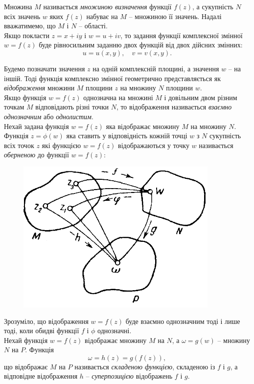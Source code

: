 Множина $M$ називається \textit{множиною визначення} функції $f(z)$, а сукупність $N$ всіх значень $w$ яких $f(z)$ набуває на $M$ -- множиною її значень. Надалі вважатимемо, що $M$ і $N$ -- області. \\

Якщо покласти $z = x + i y$ і $w = u + i v$, то задання функції комплексної змінної $w = f(z)$ буде рівносильним заданню двох функцій від двох дійсних змінних:
\begin{equation}
	\label{eq:2.1.2}
	u = u(x, y), \quad v = v(x, y).
\end{equation}

Будемо позначати значення $z$ на одній комплексній площині, а значення $w$ -- на іншій. Тоді функція комплексно змінної геометрично представляється як \textit{відображення} множини $M$ площини $z$ на множину $N$ площини $w$. \\

Якщо функція $w = f(z)$ однозначна на множині $M$ і довільним двом різним точкам $M$ відповідають різні точки $N$, то відображення називається \textit{взаємно однозначним} або \textit{однолистим}. \\

Нехай задана функція $w = f(z)$ яка відображає множину $M$ на множину $N$. Функція $z = \phi(w)$ яка ставить у відповідність кожній точці $w$ з $N$ сукупність всіх точок $z$ які функцією $w = f(z)$ відображаються у точку $w$ називається \textit{оберненою} до функції $w = f(z)$:
\begin{figure}[H]
	\centering
	\includegraphics[width=.4\linewidth]{mal-07.png}
	\label{fig:2.3}
\end{figure}

Зрозуміло, що відображення $w = f(z)$ буде взаємно однозначним тоді і лише тоді, коли обидві функції $f$ і $\phi$ однозначні. \\

Нехай функція $w = f(z)$ відображає множину $M$ на $N$, а $\omega = g(w)$ -- множину $N$ на $P$. Функція
\begin{equation}
	\label{eq:2.1.3}
	\omega = h(z) = g(f(z)),
\end{equation}
що відображає $M$ на $P$ називається \textit{складеною функцією}, складеною із $f$ і $g$, а відповідне відображення $h$ -- \textit{суперпозицією} відображень $f$ і $g$. \\

